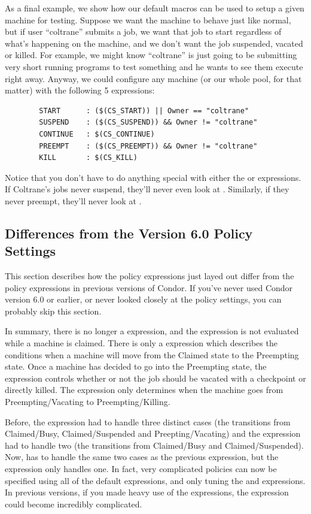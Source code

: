 As a final example, we show how our default macros can be used to
setup a given machine for testing.  Suppose we want the machine to
behave just like normal, but if user ``coltrane'' submits a job, we
want that job to start regardless of what's happening on the machine,
and we don't want the job suspended, vacated or killed.  For example,
we might know ``coltrane'' is just going to be submitting very short
running programs to test something and he wants to see them execute
right away.  Anyway, we could configure any machine (or our whole
pool, for that matter) with the following 5 expressions:
\begin{verbatim}
        START      : ($(CS_START)) || Owner == "coltrane"
        SUSPEND    : ($(CS_SUSPEND)) && Owner != "coltrane"
        CONTINUE   : $(CS_CONTINUE)
        PREEMPT    : ($(CS_PREEMPT)) && Owner != "coltrane"
        KILL       : $(CS_KILL)
\end{verbatim}
Notice that you don't have to do anything special with either the
 or  expressions.
If Coltrane's jobs never suspend, they'll never even look at
.  
Similarly, if they never preempt, they'll never look at . 

\subsection{\label{sec:V60-Policy-diffs}Differences from the 
Version 6.0 Policy Settings}

This section describes how the policy expressions just layed out
differ from the policy expressions in previous versions of Condor.
If you've never used Condor version 6.0 or earlier, or never looked
closely at the policy settings, you can probably skip this section.

In summary, there is no longer a  expression, and the
 expression is not evaluated while a machine is claimed. 
There is only a  expression which describes the
conditions when a machine will move from the Claimed state to the
Preempting state.
Once a machine has decided to go into the Preempting state, the
 expression controls whether or not the job should
be vacated with a checkpoint or directly killed.  
The  expression only determines when the machine goes from
Preempting/Vacating to Preempting/Killing.  

Before, the  expression had to handle three distinct cases
(the transitions from Claimed/Busy, Claimed/Suspended and
Preepting/Vacating) and the  expression had to handle
two (the transitions from Claimed/Busy and Claimed/Suspended).
Now,  has to handle the same two cases as the previous
 expression, but the  expression only
handles one.
In fact, very complicated policies can now be specified using all of
the default expressions, and only tuning the  and
 expressions.
In previous versions, if you made heavy use of the 
expressions, the  expression could become incredibly
complicated. 
